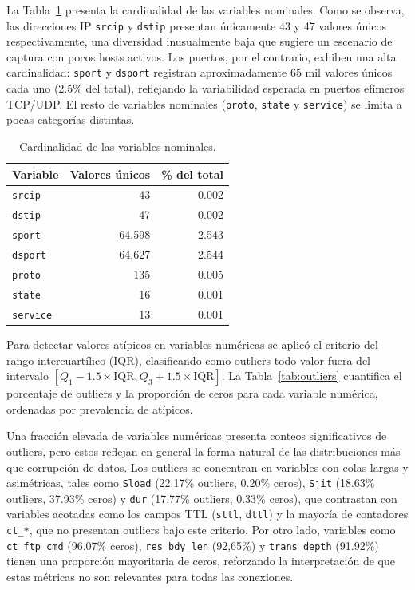 \documentclass[conference]{IEEEtran}
\begin{document}
La Tabla~\ref{tab:cardinalidad} presenta la cardinalidad de las variables nominales. Como se observa, las direcciones IP \texttt{srcip} y \texttt{dstip} presentan únicamente 43 y 47 valores únicos respectivamente, una diversidad inusualmente baja que sugiere un escenario de captura con pocos hosts activos. Los puertos, por el contrario, exhiben una alta cardinalidad: \texttt{sport} y \texttt{dsport} registran aproximadamente 65 mil valores únicos cada uno (2.5\% del total), reflejando la variabilidad esperada en puertos efímeros TCP/UDP. El resto de variables nominales (\texttt{proto}, \texttt{state} y \texttt{service}) se limita a pocas categorías distintas.

\begin{table}[h!]
\centering
\caption{Cardinalidad de las variables nominales.}
\label{tab:cardinalidad}
\begin{tabular}{lrr}
\hline
\textbf{Variable} & \textbf{Valores únicos} & \textbf{\% del total} \\
\hline
\texttt{srcip}   & 43      & 0.002 \\
\texttt{dstip}   & 47      & 0.002 \\
\texttt{sport}   & 64,598  & 2.543 \\
\texttt{dsport}  & 64,627  & 2.544 \\
\texttt{proto}   & 135     & 0.005 \\
\texttt{state}   & 16      & 0.001 \\
\texttt{service} & 13      & 0.001 \\
\hline
\end{tabular}
\end{table}

Para detectar valores atípicos en variables numéricas se aplicó el criterio del rango intercuartílico (IQR), clasificando como outliers todo valor fuera del intervalo $[Q_1 - 1.5 \times \mathrm{IQR}, Q_3 + 1.5 \times \mathrm{IQR}]$. La Tabla~\ref{tab:outliers} cuantifica el porcentaje de outliers y la proporción de ceros para cada variable numérica, ordenadas por prevalencia de atípicos.

Una fracción elevada de variables numéricas presenta conteos significativos de outliers, pero estos reflejan en general la forma natural de las distribuciones más que corrupción de datos. Los outliers se concentran en variables con colas largas y asimétricas, tales como \texttt{Sload} (22.17\% outliers, 0.20\% ceros), \texttt{Sjit} (18.63\% outliers, 37.93\% ceros) y \texttt{dur} (17.77\% outliers, 0.33\% ceros), que contrastan con variables acotadas como los campos TTL (\texttt{sttl}, \texttt{dttl}) y la mayoría de contadores \texttt{ct\_*}, que no presentan outliers bajo este criterio. Por otro lado, variables como \texttt{ct\_ftp\_cmd} (96.07\% ceros), \texttt{res\_bdy\_len}  (92,65\%) y \texttt{trans\_depth} (91.92\%) tienen una proporción mayoritaria de ceros, reforzando la interpretación de que estas métricas no son relevantes para todas las conexiones.
\end{document}
